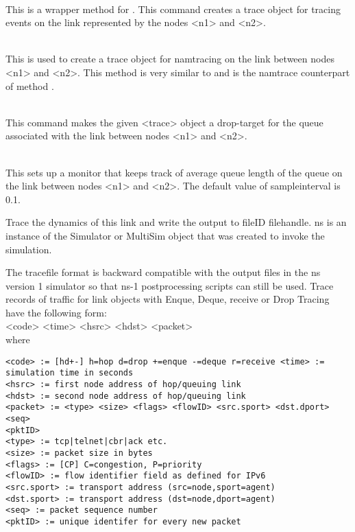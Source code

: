\begin{flushleft}
\\
This is a wrapper method for . This command creates a
trace object for tracing events on the link represented by the nodes <n1>
and <n2>.


\\
This is used to create a trace object for namtracing on the link between
nodes <n1> and <n2>. This method is very similar to and is the namtrace
counterpart of method .


\\
This command makes the given <trace> object a drop-target for the queue
associated with the link between nodes <n1> and <n2>.


\\
This sets up a monitor that keeps track of average queue length of the queue
on the link between nodes <n1> and <n2>. The default value of
sampleinterval is 0.1. 


Trace the dynamics of this link and write the output to fileID filehandle.
ns is an instance of the Simulator or MultiSim object that was created to
invoke the simulation. 

The tracefile format is backward compatible with the output files in the
ns version 1 simulator so that ns-1 postprocessing scripts can still be
used. Trace records of traffic for link objects with Enque, Deque, receive
or Drop Tracing have the following form: \\

<code> <time> <hsrc> <hdst> <packet> \\

where 
\begin{verbatim}
<code> := [hd+-] h=hop d=drop +=enque -=deque r=receive <time> :=
simulation time in seconds 
<hsrc> := first node address of hop/queuing link 
<hdst> := second node address of hop/queuing link 
<packet> := <type> <size> <flags> <flowID> <src.sport> <dst.dport> <seq>
<pktID> 
<type> := tcp|telnet|cbr|ack etc.
<size> := packet size in bytes
<flags> := [CP] C=congestion, P=priority 
<flowID> := flow identifier field as defined for IPv6 
<src.sport> := transport address (src=node,sport=agent) 
<dst.sport> := transport address (dst=node,dport=agent) 
<seq> := packet sequence number
<pktID> := unique identifer for every new packet 
\end{verbatim}


\end{flushleft}
